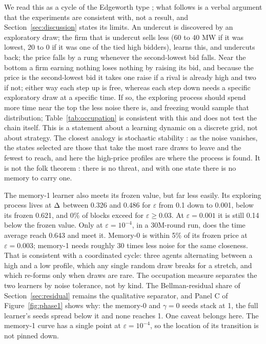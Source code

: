 We read this as a cycle of the Edgeworth type \citep{maskin1988}; what follows is a verbal argument that the experiments are consistent with, not a result, and Section~\ref{sec:discussion} states its limits. An undercut is discovered by an exploratory draw; the firm that is undercut sells less (60 to 40 MW if it was lowest, 20 to 0 if it was one of the tied high bidders), learns this, and undercuts back; the price falls by a rung whenever the second-lowest bid falls. Near the bottom a firm earning nothing loses nothing by raising its bid, and because the price is the second-lowest bid it takes one raise if a rival is already high and two if not; either way each step up is free, whereas each step down needs a specific exploratory draw at a specific time. If so, the exploring process should spend more time near the top the less noise there is, and freezing would sample that distribution; Table~\ref{tab:occupation} is consistent with this and does not test the chain itself. This is a statement about a learning dynamic on a discrete grid, not about strategy. The closest analogy is stochastic stability \citep{kandori1993,young1993}: as the noise vanishes, the states selected are those that take the most rare draws to leave and the fewest to reach, and here the high-price profiles are where the process is found. It is not the folk theorem \citep{fudenberg1986}: there is no threat, and with one state there is no memory to carry one.

The memory-1 learner also meets its frozen value, but far less easily. Its exploring process lives at $\Delta$ between 0.326 and 0.486 for $\varepsilon$ from 0.1 down to 0.001, below its frozen 0.621, and 0\% of blocks exceed  for $\varepsilon \geq 0.03$. At $\varepsilon = 0.001$ it is still 0.14 below the frozen value. Only at $\varepsilon = 10^{-4}$, in a 30M-round run, does the time average reach 0.643 and meet it. Memory-0 is within 5\% of its frozen price at $\varepsilon = 0.003$; memory-1 needs roughly 30 times less noise for the same closeness. That is consistent with a coordinated cycle: three agents alternating between a high and a low profile, which any single random draw breaks for a stretch, and which re-forms only when draws are rare. The occupation measure separates the two learners by noise tolerance, not by kind. The Bellman-residual share of Section~\ref{sec:residual} remains the qualitative separator, and Panel C of Figure~\ref{fig:phase1} shows why: the memory-0 and $\gamma = 0$ seeds stack at 1, the full learner's seeds spread below it and none reaches 1. One caveat belongs here. The memory-1 curve has a single point at $\varepsilon = 10^{-4}$, so the location of its transition is not pinned down.


